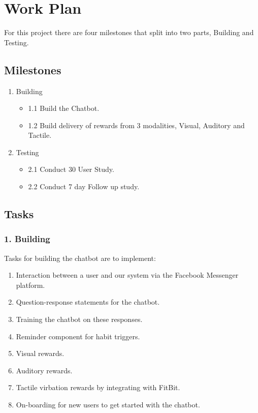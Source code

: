 
\newpage
\section{Work Plan}
For this project there are four milestones that split into two parts, Building and Testing.


\subsection{Milestones}

\begin{enumerate}
  \item Building
  \begin{itemize}
    \item 1.1 Build the Chatbot.
    \item 1.2 Build delivery of rewards from 3 modalities, Visual, Auditory and Tactile.
  \end{itemize}
  \item Testing
  \begin{itemize}
    \item 2.1 Conduct 30 User Study.
    \item 2.2 Conduct 7 day Follow up study.
  \end{itemize}
\end{enumerate}

\subsection{Tasks}

\subsubsection*{1. Building}
Tasks for building the chatbot are to implement:

\begin{enumerate}
  \item Interaction between a user and our system via the Facebook Messenger platform.
  \item Question-response statements for the chatbot.
  \item Training the chatbot on these responses.
  \item Reminder component for habit triggers.
  \item Visual rewards.
  \item Auditory rewards.
  \item Tactile virbation rewards by integrating with FitBit.
  \item On-boarding for new users to get started with the chatbot.
\end{enumerate}

